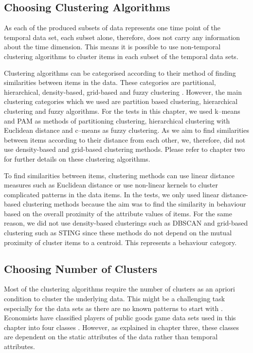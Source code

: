  \subsection{Choosing Clustering Algorithms}
 \label{sec:ChoosingClusteringAlgorithms}
 As each of the produced subsets of data represents one time point of the temporal data set, each subset alone, therefore, does not carry any information about the time dimension. This means it is possible to use non-temporal clustering algorithms to cluster items in each subset of the temporal data sets.
 
 
 Clustering algorithms can be categorised according to their method of finding similarities between items in the data. These categories are partitional, hierarchical, density-based, grid-based and fuzzy clustering \cite{Halkidi2001}. However, the main clustering categories which we used are partition based clustering,  hierarchical clustering and fuzzy algorithms. For the tests in this chapter, we used k--means and PAM as methods of partitioning clustering, hierarchical clustering with Euclidean distance and c--means as fuzzy clustering. As we aim to find similarities between items according to their distance from each other, we, therefore, did not use density-based and grid-based clustering methods.  Please refer to chapter two for further details on these clustering algorithms.
 
To find similarities between items, clustering methods can use linear distance measures such as Euclidean distance or use non-linear kernels to cluster complicated patterns in the data items. In the tests, we only used linear distance-based clustering methods because the aim was to find the similarity in behaviour based on the overall proximity of the attribute values of items. For the same reason, we did not use density-based clusterings such as DBSCAN and grid-based clustering such as STING since these methods do not depend on the mutual proximity of cluster items to a centroid. This represents a behaviour category.
 
 \subsection{Choosing Number of Clusters}
 \label{sec:Choosing-Number-of-Clusters}
 Most of the clustering algorithms require the number of clusters as an apriori condition to cluster the underlying data. This might be a challenging task especially for the data sets as there are no known patterns to start with \cite{Jain2010a}. Economists have classified players of public goods game data sets used in this chapter into four classes \cite{Fischbacher2001}. However, as explained in chapter three, these classes are dependent on the static attributes of the data rather than temporal attributes.
 
